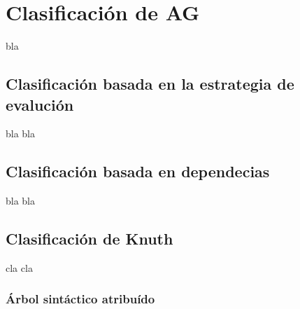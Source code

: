 \chapter{Clasificaci\'on de AG}
\label{chap: clas_ag}
\minitoc


bla

\section{Clasificaci\'on basada en la estrategia de evaluci\'on}

bla bla

\section{Clasificaci\'on basada en dependecias}

bla bla
\section{Clasificaci\'on de Knuth}

cla cla
\subsection{\'Arbol sint\'actico atribu\'ido}

